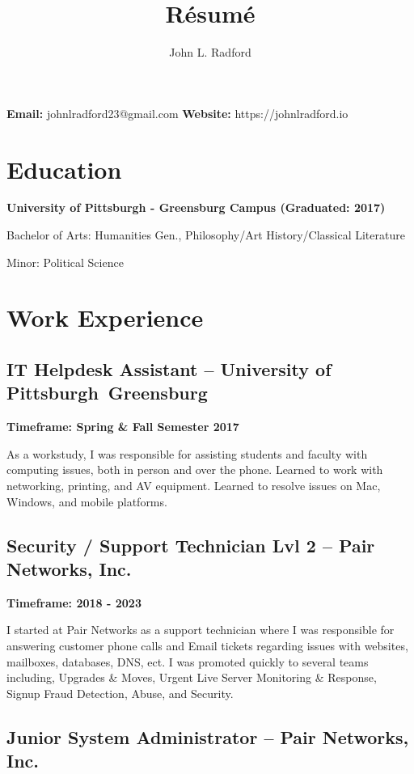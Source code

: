 \documentclass{article}
\makeatletter
\renewcommand{\maketitle}{
\begin{flushleft}
{\huge\bfseries
\theauthor}

\vspace{.25em}
\textbf{Email:} johnlradford23@gmail.com
\textbf{Website:} https://johnlradford.io 
\end{flushleft}
}
\makeatother
\begin{document}
\title{R\'esum\'e}
\author{John L. Radford}

\maketitle

\section{Education}

\noindent
\textbf{University of Pittsburgh - Greensburg Campus (Graduated: 2017)}

Bachelor of Arts: Humanities Gen., Philosophy/Art History/Classical Literature

Minor: Political Science

\section{Work Experience}

\subsection{IT Helpdesk Assistant -- University of Pittsburgh Greensburg}

\noindent
\textbf{Timeframe: Spring \& Fall Semester 2017}

As a workstudy, I was responsible for assisting students and faculty with
computing issues, both in person and over the phone. Learned to work with
networking, printing, and AV equipment. Learned to resolve issues on Mac,
Windows, and mobile platforms.

\subsection{Security / Support Technician Lvl 2 -- Pair Networks, Inc.}

\noindent
\textbf{Timeframe: 2018 - 2023}

I started at Pair Networks as a support technician where I was responsible for
answering customer phone calls and Email tickets regarding issues with
websites, mailboxes, databases, DNS, ect. I was promoted quickly to several
teams including, Upgrades \& Moves, Urgent Live Server Monitoring \& Response,
Signup Fraud Detection, Abuse, and Security.

\subsection{Junior System Administrator -- Pair Networks, Inc.}
\end{document}
